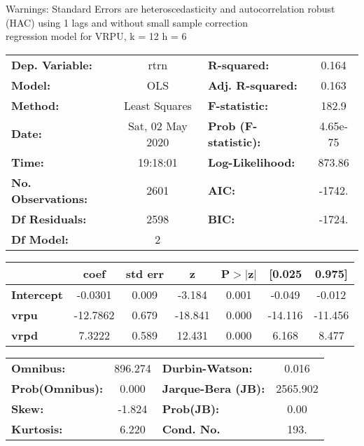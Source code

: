 Warnings: \newline
 [1] Standard Errors are heteroscedasticity and autocorrelation robust (HAC) using 1 lags and without small sample correction\\ 

regression model for VRPU, k = 12 h = 6\begin{center}
\begin{tabular}{lclc}
\toprule
\textbf{Dep. Variable:}    &       rtrn       & \textbf{  R-squared:         } &     0.164   \\
\textbf{Model:}            &       OLS        & \textbf{  Adj. R-squared:    } &     0.163   \\
\textbf{Method:}           &  Least Squares   & \textbf{  F-statistic:       } &     182.9   \\
\textbf{Date:}             & Sat, 02 May 2020 & \textbf{  Prob (F-statistic):} &  4.65e-75   \\
\textbf{Time:}             &     19:18:01     & \textbf{  Log-Likelihood:    } &    873.86   \\
\textbf{No. Observations:} &        2601      & \textbf{  AIC:               } &    -1742.   \\
\textbf{Df Residuals:}     &        2598      & \textbf{  BIC:               } &    -1724.   \\
\textbf{Df Model:}         &           2      & \textbf{                     } &             \\
\bottomrule
\end{tabular}
\begin{tabular}{lcccccc}
                   & \textbf{coef} & \textbf{std err} & \textbf{z} & \textbf{P$> |$z$|$} & \textbf{[0.025} & \textbf{0.975]}  \\
\midrule
\textbf{Intercept} &      -0.0301  &        0.009     &    -3.184  &         0.001        &       -0.049    &       -0.012     \\
\textbf{vrpu}      &     -12.7862  &        0.679     &   -18.841  &         0.000        &      -14.116    &      -11.456     \\
\textbf{vrpd}      &       7.3222  &        0.589     &    12.431  &         0.000        &        6.168    &        8.477     \\
\bottomrule
\end{tabular}
\begin{tabular}{lclc}
\textbf{Omnibus:}       & 896.274 & \textbf{  Durbin-Watson:     } &    0.016  \\
\textbf{Prob(Omnibus):} &   0.000 & \textbf{  Jarque-Bera (JB):  } & 2565.902  \\
\textbf{Skew:}          &  -1.824 & \textbf{  Prob(JB):          } &     0.00  \\
\textbf{Kurtosis:}      &   6.220 & \textbf{  Cond. No.          } &     193.  \\
\bottomrule
\end{tabular}
\end{center}

